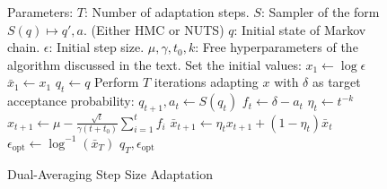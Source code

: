 \begin{figure}[H]
	\begin{algorithm}[H]
	\caption{Dual-Averaging Step Size Adaptation}\label{algo:dual_step_size_adaptation}
	\begin{algorithmic}
        \State Parameters:
        \State $T$: Number of adaptation steps.
        \State $S$: Sampler of the form $S(q) \mapsto q', a$. (Either HMC or NUTS)
        \State $q$: Initial state of Markov chain.
        \State $\epsilon$: Initial step size.
        \State $\mu, \gamma, t_0, k$: Free hyperparameters of the algorithm discussed in the text. 
            \State Set the initial values:
            \State $x_1 \gets \log \epsilon$
            \State $\bar{x}_1 \gets x_1$
            \State $q_t \gets q$
            \State Perform $T$ iterations adapting $x$ with $\delta$ as target acceptance probability:
                \State $q_{t+1}, a_t \gets S(q_t)$ 
                \State $f_t \gets \delta - a_t$ 
                \State $\eta_t \gets t^{-k}$ 
                \State $x_{t+1} \gets \mu - \frac{\sqrt{t}}{\gamma(t + t_0)}\sum_{i=1}^t f_i$ 
                \State $\bar{x}_{t+1} \gets \eta_t x_{t+1} + (1 - \eta_t)\bar{x}_t$ 
            \EndFor
            \State $\epsilon_\text{opt} \gets \log^{-1}(\bar{x}_T)$ 
            \State \Return $q_T, \epsilon_\text{opt}$ 
        \EndFunction
	\end{algorithmic}
	\end{algorithm}
\end{figure}
